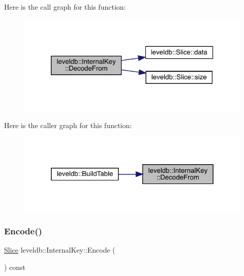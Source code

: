 Here is the call graph for this function\+:
\nopagebreak
\begin{figure}[H]
\begin{center}
\leavevmode
\includegraphics[width=320pt]{classleveldb_1_1_internal_key_a5a8c9bced0ba968b6b62d91cfb19a82a_cgraph}
\end{center}
\end{figure}
Here is the caller graph for this function\+:
\nopagebreak
\begin{figure}[H]
\begin{center}
\leavevmode
\includegraphics[width=319pt]{classleveldb_1_1_internal_key_a5a8c9bced0ba968b6b62d91cfb19a82a_icgraph}
\end{center}
\end{figure}
\mbox{\label{classleveldb_1_1_internal_key_a0cb2fdabc879bdbe7afc3ba12152384c}} 
\subsubsection{\texorpdfstring{Encode()}{Encode()}}
{\footnotesize\ttfamily \mbox{\hyperlink{classleveldb_1_1_slice}{Slice}} leveldb\+::\+Internal\+Key\+::\+Encode (\begin{DoxyParamCaption}{ }\end{DoxyParamCaption}) const\hspace{0.3cm}{\ttfamily [inline]}}

